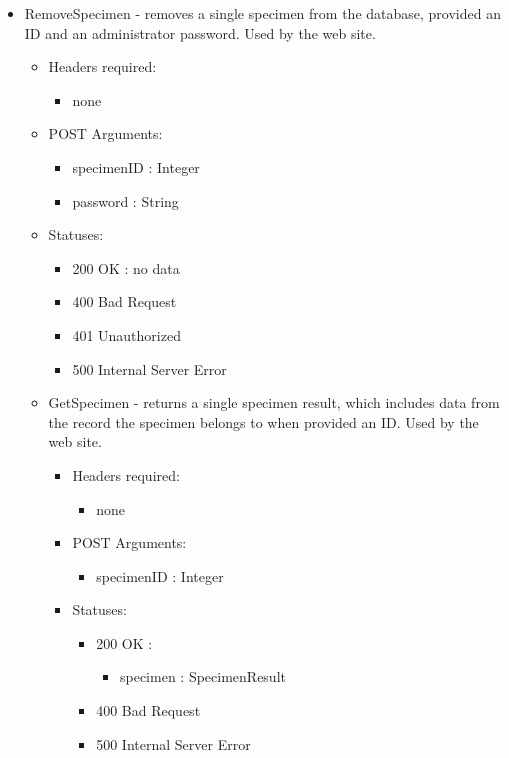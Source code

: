 \begin{itemize}
        \item RemoveSpecimen - removes a single specimen from the database, provided an ID and an administrator password. Used by the web site.
        \begin{itemize}
        \item Headers required: 
        \begin{itemize}
        	\item none
        \end{itemize}
        \item POST Arguments:
        \begin{itemize}
        	\item specimenID : Integer
        	\item password : String
        \end{itemize}
        \item Statuses:
        \begin{itemize}
        	\item 200 OK : no data
        	\item 400 Bad Request
        	\item 401 Unauthorized
        	\item 500 Internal Server Error
        \end{itemize}


        \item GetSpecimen - returns a single specimen result, which includes data from the record the specimen belongs to when provided an ID. Used by the web site.
        \begin{itemize}
        \item Headers required: 
        \begin{itemize}
            \item none
        \end{itemize}
        \item POST Arguments:
        \begin{itemize}
        	\item specimenID : Integer
        \end{itemize}
        \item Statuses:
        \begin{itemize}
        	\item 200 OK :
            \begin{itemize}
                \item specimen : SpecimenResult
            \end{itemize}
        	\item 400 Bad Request
        	\item 500 Internal Server Error
        \end{itemize}



\end{itemize}
\end{itemize}
\end{itemize}

